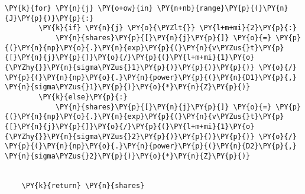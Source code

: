 \begin{tcolorbox}[breakable, size=fbox, boxrule=1pt, pad at break*=1mm,colback=cellbackground, colframe=cellborder]
\begin{Verbatim}[commandchars=\\\{\}]
    \PY{k}{for} \PY{n}{j} \PY{o+ow}{in} \PY{n+nb}{range}\PY{p}{(}\PY{n}{J}\PY{p}{)}\PY{p}{:}
        \PY{k}{if} \PY{n}{j} \PY{o}{\PYZlt{}} \PY{l+m+mi}{2}\PY{p}{:}
            \PY{n}{shares}\PY{p}{[}\PY{n}{j}\PY{p}{]} \PY{o}{=} \PY{p}{(}\PY{n}{np}\PY{o}{.}\PY{n}{exp}\PY{p}{(}\PY{n}{v\PYZus{}t}\PY{p}{[}\PY{n}{j}\PY{p}{]}\PY{o}{/}\PY{p}{(}\PY{l+m+mi}{1}\PY{o}{\PYZhy{}}\PY{n}{sigma\PYZus{}1}\PY{p}{)}\PY{p}{)}\PY{p}{)} \PY{o}{/}  \PY{p}{(}\PY{n}{np}\PY{o}{.}\PY{n}{power}\PY{p}{(}\PY{n}{D1}\PY{p}{,} \PY{n}{sigma\PYZus{}1}\PY{p}{)}\PY{o}{*}\PY{n}{Z}\PY{p}{)}
        \PY{k}{else}\PY{p}{:}
            \PY{n}{shares}\PY{p}{[}\PY{n}{j}\PY{p}{]} \PY{o}{=} \PY{p}{(}\PY{n}{np}\PY{o}{.}\PY{n}{exp}\PY{p}{(}\PY{n}{v\PYZus{}t}\PY{p}{[}\PY{n}{j}\PY{p}{]}\PY{o}{/}\PY{p}{(}\PY{l+m+mi}{1}\PY{o}{\PYZhy{}}\PY{n}{sigma\PYZus{}2}\PY{p}{)}\PY{p}{)}\PY{p}{)} \PY{o}{/}  \PY{p}{(}\PY{n}{np}\PY{o}{.}\PY{n}{power}\PY{p}{(}\PY{n}{D2}\PY{p}{,} \PY{n}{sigma\PYZus{}2}\PY{p}{)}\PY{o}{*}\PY{n}{Z}\PY{p}{)}


    \PY{k}{return} \PY{n}{shares}

\end{Verbatim}
\end{tcolorbox}

